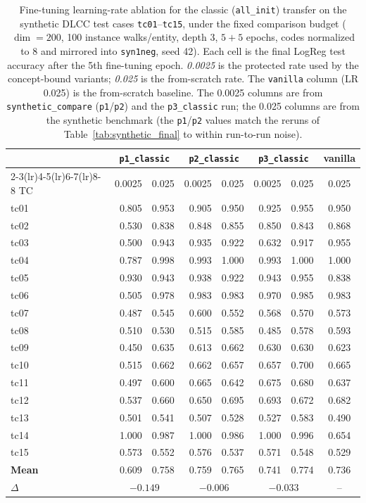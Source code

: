 \begin{table}[ht]
\centering
\small
\caption{Fine-tuning learning-rate ablation for the classic (\texttt{all\_init}) transfer on the synthetic DLCC test cases \texttt{tc01}--\texttt{tc15}, under the fixed comparison budget ($\dim=200$, 100 instance walks/entity, depth 3, $5+5$ epochs, codes normalized to $8$ and mirrored into \texttt{syn1neg}, seed 42). Each cell is the final LogReg test accuracy after the 5th fine-tuning epoch. \emph{0.0025} is the protected rate used by the concept-bound variants; \emph{0.025} is the from-scratch rate. The \texttt{vanilla} column (LR 0.025) is the from-scratch baseline. The 0.0025 columns are from \texttt{synthetic\_compare} (\texttt{p1}/\texttt{p2}) and the \texttt{p3\_classic} run; the 0.025 columns are from the synthetic benchmark (the \texttt{p1}/\texttt{p2} values match the reruns of Table~\ref{tab:synthetic_final} to within run-to-run noise).}
\label{tab:lr_ablation}
\begin{tabular}{l rr rr rr c}
\toprule
 & \multicolumn{2}{c}{\texttt{p1\_classic}} & \multicolumn{2}{c}{\texttt{p2\_classic}} & \multicolumn{2}{c}{\texttt{p3\_classic}} & vanilla \\
\cmidrule(lr){2-3}\cmidrule(lr){4-5}\cmidrule(lr){6-7}\cmidrule(lr){8-8}
TC & 0.0025 & 0.025 & 0.0025 & 0.025 & 0.0025 & 0.025 & 0.025 \\
\midrule
tc01 & 0.805 & 0.953 & 0.905 & 0.950 & 0.925 & 0.955 & 0.950 \\
tc02 & 0.530 & 0.838 & 0.848 & 0.855 & 0.850 & 0.843 & 0.868 \\
tc03 & 0.500 & 0.943 & 0.935 & 0.922 & 0.632 & 0.917 & 0.955 \\
tc04 & 0.787 & 0.998 & 0.993 & 1.000 & 0.993 & 1.000 & 1.000 \\
tc05 & 0.930 & 0.943 & 0.938 & 0.922 & 0.943 & 0.955 & 0.838 \\
tc06 & 0.505 & 0.978 & 0.983 & 0.983 & 0.970 & 0.985 & 0.983 \\
tc07 & 0.487 & 0.545 & 0.600 & 0.552 & 0.568 & 0.570 & 0.573 \\
tc08 & 0.510 & 0.530 & 0.515 & 0.585 & 0.485 & 0.578 & 0.593 \\
tc09 & 0.450 & 0.635 & 0.613 & 0.662 & 0.630 & 0.630 & 0.623 \\
tc10 & 0.515 & 0.662 & 0.662 & 0.657 & 0.657 & 0.700 & 0.665 \\
tc11 & 0.497 & 0.600 & 0.665 & 0.642 & 0.675 & 0.680 & 0.637 \\
tc12 & 0.537 & 0.660 & 0.650 & 0.695 & 0.693 & 0.672 & 0.682 \\
tc13 & 0.501 & 0.541 & 0.507 & 0.528 & 0.527 & 0.583 & 0.490 \\
tc14 & 1.000 & 0.987 & 1.000 & 0.986 & 1.000 & 0.996 & 0.654 \\
tc15 & 0.573 & 0.552 & 0.576 & 0.537 & 0.571 & 0.548 & 0.529 \\
\midrule
\textbf{Mean} & 0.609 & 0.758 & 0.759 & 0.765 & 0.741 & 0.774 & 0.736 \\
\midrule
$\Delta$ & \multicolumn{2}{c}{$-0.149$} & \multicolumn{2}{c}{$-0.006$} & \multicolumn{2}{c}{$-0.033$} & -- \\
\bottomrule
\end{tabular}
\end{table}
